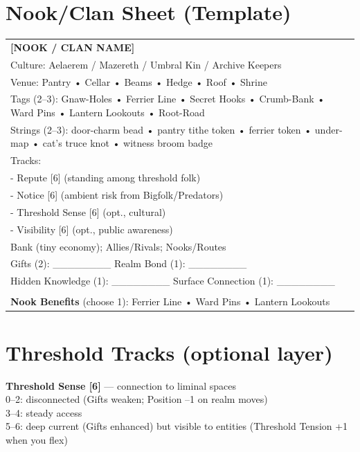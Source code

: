 \documentclass[11pt,letterpaper]{article}
\newcommand{\thresholdtrack}[2]{\textbf{#1 [#2]}}
\begin{document}
\section{Nook/Clan Sheet (Template)}

\begin{center}
\begin{tabularx}{\textwidth}{|X|}
\hline
\textbf{[NOOK / CLAN NAME]} \\
Culture: Aelaerem / Mazereth / Umbral Kin / Archive Keepers \\
Venue: Pantry • Cellar • Beams • Hedge • Roof • Shrine \\
Tags (2--3): Gnaw-Holes • Ferrier Line • Secret Hooks • Crumb-Bank • Ward Pins • Lantern Lookouts • Root-Road \\
Strings (2--3): door-charm bead • pantry tithe token • ferrier token • under-map • cat's truce knot • witness broom badge \\
Tracks: \\
- Repute [6] (standing among threshold folk) \\
- Notice [6] (ambient risk from Bigfolk/Predators) \\
- Threshold Sense [6] (opt., cultural) \\
- Visibility [6] (opt., public awareness) \\
Bank (tiny economy); Allies/Rivals; Nooks/Routes \\
Gifts (2): \_\_\_\_\_\_\_\_  Realm Bond (1): \_\_\_\_\_\_\_\_ \\
Hidden Knowledge (1): \_\_\_\_\_\_\_\_  Surface Connection (1): \_\_\_\_\_\_\_\_ \\
\\
\textbf{Nook Benefits} (choose 1): Ferrier Line • Ward Pins • Lantern Lookouts \\
\hline
\end{tabularx}
\end{center}

\section{Threshold Tracks (optional layer)}

\thresholdtrack{Threshold Sense}{6} --- connection to liminal spaces \\
0--2: disconnected (Gifts weaken; Position --1 on realm moves) \\
3--4: steady access \\
5--6: deep current (Gifts enhanced) but visible to entities (Threshold Tension +1 when you flex)
\end{document}
